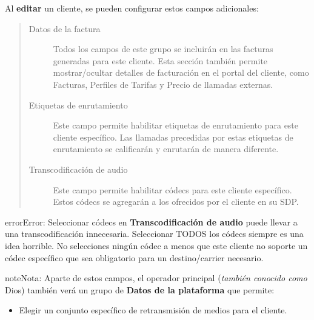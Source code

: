 \documentclass[letterpaper,10pt,spanish]{sphinxmanual}
\begin{document}
Al \textbf{editar} un cliente, se pueden configurar estos campos adicionales:
\begin{quote}
\begin{description}
\item[{Datos de la factura}] \leavevmode
Todos los campos de este grupo se incluirán en las facturas generadas para este cliente. Esta sección también permite mostrar/ocultar detalles de facturación en el portal del cliente, como Facturas, Perfiles de Tarifas y Precio de llamadas externas.

\item[{Etiquetas de enrutamiento}] \leavevmode
Este campo permite habilitar etiquetas de enrutamiento para este cliente específico. Las llamadas precedidas por estas etiquetas de enrutamiento se calificarán y enrutarán de manera diferente.

\item[{Transcodificación de audio}] \leavevmode
Este campo permite habilitar códecs para este cliente específico. Estos códecs se agregarán a los ofrecidos por el cliente en su SDP.

\end{description}
\end{quote}

\begin{notice}{error}{Error:}
Seleccionar códecs en \textbf{Transcodificación de audio} puede llevar a una transcodificación innecesaria. Seleccionar TODOS los códecs siempre es una idea horrible. No selecciones ningún códec a menos que este cliente no soporte un códec específico que sea obligatorio para un destino/carrier necesario.
\end{notice}

\begin{notice}{note}{Nota:}
Aparte de estos campos, el operador principal (\emph{también conocido como} Dios) también verá un grupo de \textbf{Datos de la plataforma} que permite:
\begin{itemize}
\item {} 
Elegir un conjunto específico de retransmisión de medios para el cliente.

\end{itemize}
\end{notice}
\end{document}
